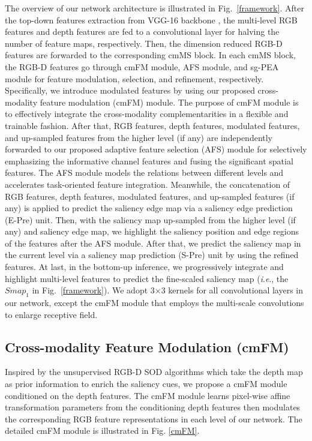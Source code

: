 \documentclass[runningheads]{llncs}
\newcommand{\ie}{\textit{i}.\textit{e}.}
\begin{document}
The overview of our network architecture is illustrated in Fig.~\ref{framework}.
After the top-down features extraction from VGG-16 backbone \cite{VGG},
the multi-level RGB features and depth features are fed to a convolutional layer for halving the number of feature maps, respectively. Then, the dimension reduced RGB-D features are forwarded to the corresponding cmMS block. In each cmMS block, the RGB-D features go through cmFM module, AFS module, and sg-PEA module for feature modulation, selection, and refinement, respectively.
Specifically, we introduce modulated features by using our proposed cross-modality feature modulation (cmFM) module. The purpose of cmFM module is to effectively integrate the cross-modality complementarities in a flexible and trainable fashion.
After that, RGB features, depth features, modulated features, and  up-sampled features from the higher level (if any) are independently forwarded to our proposed adaptive feature selection (AFS) module for selectively emphasizing the informative channel features and fusing the significant spatial features. The AFS module models the relations between different levels and accelerates task-oriented feature integration.
Meanwhile, the concatenation of RGB features, depth features, modulated features, and up-sampled features (if any) is applied to predict the saliency edge map via a saliency edge prediction (E-Pre) unit.
Then, with the saliency map up-sampled from the higher level (if any) and saliency edge map, we highlight the saliency position and edge regions of the features after the AFS module.  After that, we predict the saliency map in the current level via a saliency map prediction (S-Pre) unit by using the refined features.
At last,  in the bottom-up inference, we progressively integrate and highlight multi-level features to predict the fine-scaled saliency map (\ie, the $Smap_{1}$ in Fig.~\ref{framework}).
We adopt 3$\times$3  kernels for all convolutional layers in our network, except the cmFM module that employs the multi-scale convolutions to enlarge receptive field.



\subsection{Cross-modality Feature Modulation (cmFM)}
Inspired by the unsupervised RGB-D SOD algorithms \cite{DCMC,LBE}  which take the depth map as prior information to enrich the saliency cues, we propose a cmFM module conditioned on the depth features. The cmFM module learns pixel-wise affine transformation parameters from the conditioning depth features then modulates the corresponding RGB feature representations in each level of our network. The detailed cmFM module is illustrated in Fig. \ref{cmFM}.
\end{document}
